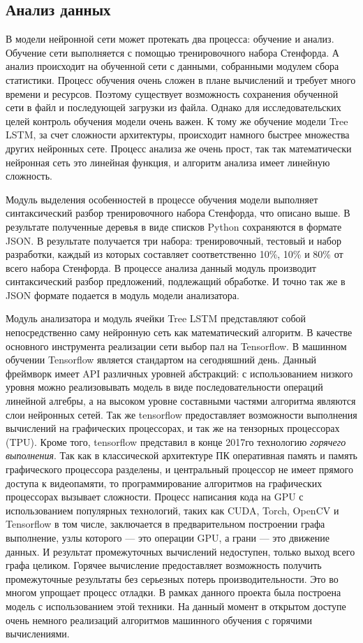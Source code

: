 \subsection{Анализ данных}\label{subsec:sys:data_analysis}
В модели нейронной сети может протекать два процесса: обучение и анализ. Обучение сети выполняется с помощью тренировочного набора Стенфорда. А анализ происходит на обученной сети с данными, собранными модулем сбора статистики. Процесс обучения очень сложен в плане вычислений и требует много времени и ресурсов. Поэтому существует возможность сохранения обученной сети в файл и последующей загрузки из файла. Однако для исследовательских целей контроль обучения модели очень важен. К тому же обучение модели Tree LSTM, за счет сложности архитектуры, происходит намного быстрее множества других нейронных сете. Процесс анализа же очень прост, так так математически нейронная сеть это линейная функция, и алгоритм анализа имеет линейную сложность.

Модуль выделения особенностей в процессе обучения модели выполняет синтаксический разбор тренировочного набора Стенфорда, что описано выше. В результате полученные деревья в виде списков Python сохраняются в формате JSON\@. В результате получается три набора: тренировочный, тестовый и набор разработки, каждый из которых составляет соответственно 10\%, 10\% и 80\% от всего набора Стенфорда. В процессе анализа данный модуль производит синтаксический разбор предложений, подлежащий обработке. И точно так же в JSON формате подается в модуль модели анализатора.

Модуль анализатора и модуль ячейки Tree LSTM представляют собой непосредственно саму нейронную сеть как математический алгоритм. В качестве основного инструмента реализации сети выбор пал на Tensorflow. В машинном обучении Tensorflow является стандартом на сегодняшний день. Данный фреймворк имеет API различных уровней абстракций: с использованием низкого уровня можно реализовывать модель в виде последовательности операций линейной алгебры, а на высоком уровне составными частями алгоритма являются слои нейронных сетей. Так же tensorflow предоставляет возможности выполнения вычислений на графических процессорах, и так же на тензорных процессорах (TPU).
Кроме того, tensorflow представил в конце 2017го технологию \textit{горячего выполнения}. Так как в классической архитектуре ПК оперативная память и память графического процессора разделены, и центральный процессор не имеет прямого доступа к видеопамяти, то программирование алгоритмов на графических процессорах вызывает сложности. Процесс написания кода на GPU с использованием популярных технологий, таких как CUDA, Torch, OpenCV и Tensorflow в том числе, заключается в предварительном построении графа выполнение, узлы которого --- это операции GPU, а грани --- это движение данных. И результат промежуточных вычислений недоступен, только выход всего графа целиком. Горячее вычисление предоставляет возможность получить промежуточные результаты без серьезных потерь производительности. Это во многом упрощает процесс отладки. В рамках данного проекта была построена модель с использованием этой техники. На данный момент в открытом доступе очень немного реализаций алгоритмов машинного обучения с горячими вычислениями.

